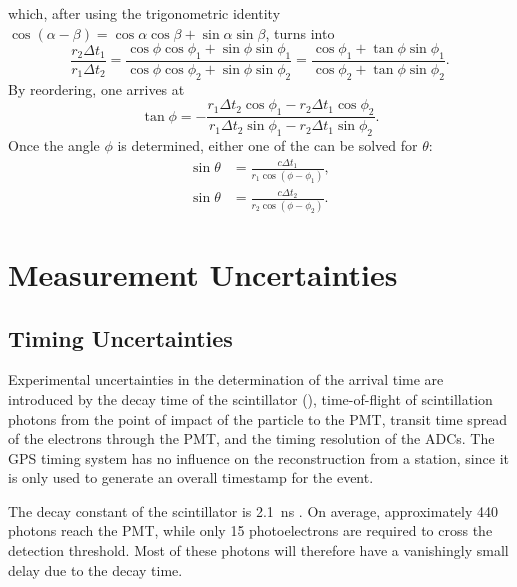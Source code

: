 which, after using the trigonometric identity $\cos(\alpha - \beta) = \cos
\alpha \cos \beta + \sin \alpha \sin \beta$, turns into
\begin{equation}
\frac{r_2 \Delta t_1}{r_1 \Delta t_2}
= \frac{\cos \phi \cos \phi_1 + \sin \phi \sin \phi_1}{\cos \phi \cos \phi_2 + \sin \phi \sin \phi_2}
= \frac{\cos \phi_1 + \tan \phi \sin \phi_1}{\cos \phi_2 + \tan \phi \sin \phi_2}.
\end{equation}
By reordering, one arrives at
\begin{equation}
\label{eq:phi}
\tan \phi = - \frac{r_1 \Delta t_2 \cos \phi_1 - r_2 \Delta t_1 \cos \phi_2}{r_1 \Delta t_2 \sin \phi_1 - r_2 \Delta t_1 \sin \phi_2}.
\end{equation}
Once the angle $\phi$ is determined, either one of the  can be
solved for $\theta$:
\begin{subequations}
\label{eq:theta}
\begin{align}
\label{eq:theta1}
\sin \theta &= \frac{c \Delta t_1}{r_1 \cos(\phi - \phi_1)}, \\
\label{eq:theta2}
\sin \theta &= \frac{c \Delta t_2}{r_2 \cos(\phi - \phi_2)}.
\end{align}
\end{subequations}


\section{Measurement Uncertainties}
\label{sec:uncertainty-calculations}

\subsection{Timing Uncertainties}
\label{sec:uncertainty-sources}

Experimental uncertainties in the determination of the arrival time are
introduced by the decay time of the scintillator (),
time-of-flight of scintillation photons from the point of impact of the particle
to the PMT, transit time spread of the electrons through the PMT, and the timing
resolution of the ADCs.  The GPS timing system has no influence on the
reconstruction from a station, since it is only used to generate an overall
timestamp for the event.

The decay constant of the scintillator is \SI{2.1}{\nano\second} \cite{BC-408}.
On average, approximately \num{440} photons reach the PMT, while only \num{15}
photoelectrons are required to cross the detection threshold. Most of these
photons will therefore have a vanishingly small delay due to the decay time.

